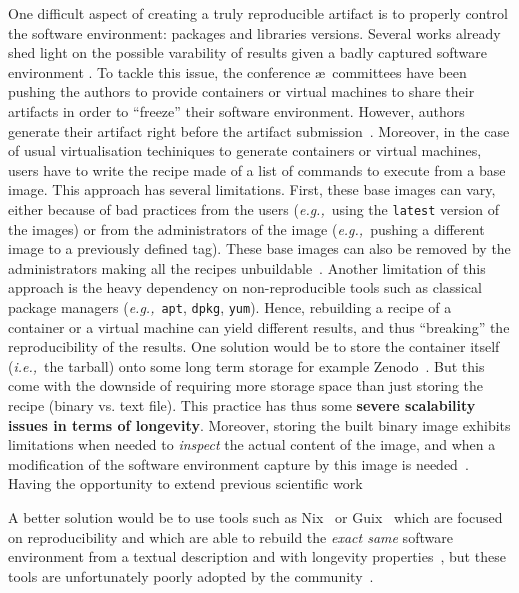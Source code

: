 \documentclass[sigconf,natbib=false]{acmart}
\newcommand{\ie}{\emph{i.e.,}}
\newcommand{\eg}{\emph{e.g.,}}
\newcommand{\todo}[1]{{\color{red}{TODO: #1}}}
\begin{document}
One difficult aspect of creating a truly reproducible artifact is to properly control the software environment: packages and libraries versions.
Several works already shed light on the possible varability of results given a badly captured software environment \cite{mytkowicz_producing_nodate} \todo{more}.
To tackle this issue, the conference \ae\ committees have been pushing the authors to provide containers or virtual machines to share their artifacts in order to ``freeze'' their software environment.
However, authors generate their artifact right before the artifact submission~\cite{guilloteau2024longevity, guilloteau2024frustrations}.
Moreover, in the case of usual virtualisation techiniques to generate containers or virtual machines, users have to write the recipe made of a list of commands to execute from a base image.
This approach has several limitations.
First, these base images can vary, either because of bad practices from the users (\eg\ using the \texttt{latest} version of the images) or from the administrators of the image (\eg\ pushing a different image to a previously defined tag).
These base images can also be removed by the administrators making all the recipes unbuildable~\cite{nvidia_cuda_lifetime}.
Another limitation of this approach is the heavy dependency on non-reproducible tools such as classical package managers (\eg\ \texttt{apt}, \texttt{dpkg}, \texttt{yum}).
Hence, rebuilding a recipe of a container or a virtual machine can yield different results, and thus ``breaking'' the reproducibility of the results.
One solution would be to store the container itself (\ie\ the tarball) onto some long term storage for example Zenodo~\cite{zenodo}.
But this come with the downside of requiring more storage space than just storing the recipe (binary vs. text file).
This practice has thus some \textbf{severe scalability issues in terms of longevity}.
Moreover, storing the built binary image exhibits limitations when needed to \emph{inspect} the actual content of the image, and when a modification of the software environment capture by this image is needed~\cite{mercier2018considering}.
Having the opportunity to extend previous scientific work \todo{...}

A better solution would be to use tools such as Nix~\cite{dolstra_nix_2004} or Guix~\cite{courtes_functional_2013} which are focused on reproducibility and which are able to rebuild the \emph{exact same} software environment from a textual description and with longevity properties~\cite{courtes2024source}, but these tools are unfortunately poorly adopted by the community~\cite{guilloteau2024longevity}.
\end{document}
